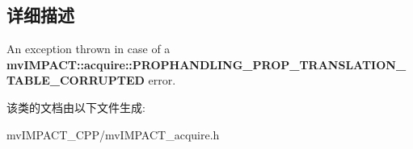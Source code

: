 \subsection{详细描述}
An exception thrown in case of a {\bfseries mv\+I\+M\+P\+A\+C\+T\+::acquire\+::\+P\+R\+O\+P\+H\+A\+N\+D\+L\+I\+N\+G\+\_\+\+P\+R\+O\+P\+\_\+\+T\+R\+A\+N\+S\+L\+A\+T\+I\+O\+N\+\_\+\+T\+A\+B\+L\+E\+\_\+\+C\+O\+R\+R\+U\+P\+T\+E\+D} error. 

该类的文档由以下文件生成\+:\begin{DoxyCompactItemize}
\item 
mv\+I\+M\+P\+A\+C\+T\+\_\+\+C\+P\+P/mv\+I\+M\+P\+A\+C\+T\+\_\+acquire.\+h\end{DoxyCompactItemize}
